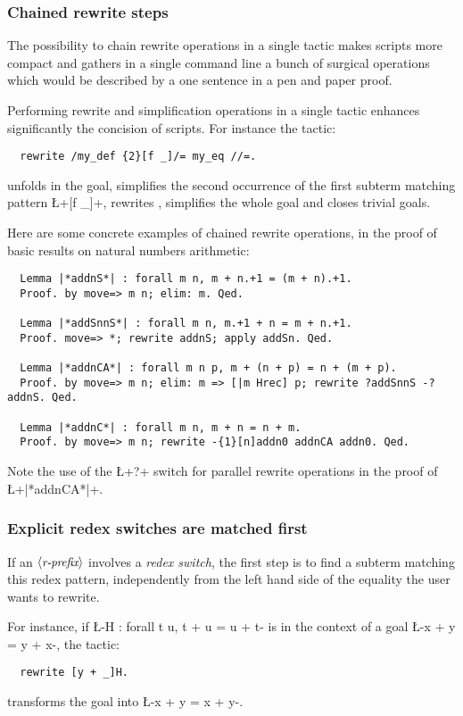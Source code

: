 \subsubsection*{Chained rewrite steps}


The possibility to chain rewrite operations in a single tactic makes
scripts more compact and gathers in a single command line a bunch
of surgical
operations  which would be described by a one sentence in a pen and
paper proof.

Performing rewrite and simplification operations in a single tactic
enhances significantly the concision of scripts. For instance the
tactic:
\begin{lstlisting}
  rewrite /my_def {2}[f _]/= my_eq //=.
\end{lstlisting}
unfolds  in the goal, simplifies the second occurrence of the
first subterm matching pattern \L+[f _]+, rewrites ,
simplifies the whole goal and closes trivial goals.

Here are some concrete examples of chained rewrite operations, in the
proof of basic results on natural numbers arithmetic:

\begin{lstlisting}
  Lemma |*addnS*| : forall m n, m + n.+1 = (m + n).+1.
  Proof. by move=> m n; elim: m. Qed.

  Lemma |*addSnnS*| : forall m n, m.+1 + n = m + n.+1.
  Proof. move=> *; rewrite addnS; apply addSn. Qed.

  Lemma |*addnCA*| : forall m n p, m + (n + p) = n + (m + p).
  Proof. by move=> m n; elim: m => [|m Hrec] p; rewrite ?addSnnS -?addnS. Qed.

  Lemma |*addnC*| : forall m n, m + n = n + m.
  Proof. by move=> m n; rewrite -{1}[n]addn0 addnCA addn0. Qed.
\end{lstlisting}

Note the use of the \L+?+ switch for parallel rewrite operations in
the proof of \L+|*addnCA*|+.

\subsubsection*{Explicit redex switches are matched first}
If an $\langle\mbox{\itshape\rmfamily\small r-prefix}\rangle$ involves a \emph{redex switch}, the first step is to
find a subterm matching this redex pattern, independently from the left hand
side  of the equality the user wants to rewrite.

For instance, if \L-H : forall t u, t + u = u + t- is in the context of a
goal \L-x + y = y + x-, the tactic:
\begin{lstlisting}
  rewrite [y + _]H.
\end{lstlisting}
transforms the goal into \L-x + y = x + y-.

